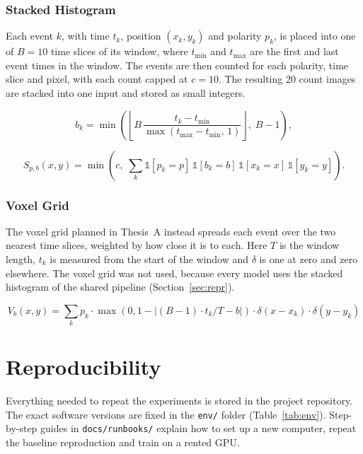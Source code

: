\documentclass[11pt, a4paper]{report}
\begin{document}
\subsection{Stacked Histogram}
\label{subsec:stacked_hist}
Each event $k$, with time $t_k$, position $(x_k, y_k)$ and polarity $p_k$, is placed into one of $B=10$ time
slices of its window, where $t_{\min}$ and $t_{\max}$ are the first and last event times in the window. The
events are then counted for each polarity, time slice and pixel, with each count capped at $c=10$. The
resulting 20 count images are stacked into one input and stored as small integers.

\begin{equation}
  b_k = \min\!\left(\left\lfloor B\,\frac{t_k - t_{\min}}{\max(t_{\max}-t_{\min},\,1)}\right\rfloor,\; B-1\right),
  \label{eq:sh_bin}
\end{equation}

\begin{equation}
  S_{p,b}(x,y) = \min\!\left(c,\; \sum_k \mathbb{1}[p_k=p]\,\mathbb{1}[b_k=b]\,\mathbb{1}[x_k=x]\,\mathbb{1}[y_k=y]\right).
  \label{eq:sh_count}
\end{equation}

\subsection{Voxel Grid}
The voxel grid planned in Thesis~A instead spreads each event over the two nearest time slices, weighted by
how close it is to each. Here $T$ is the window length, $t_k$ is measured from the start of the window and
$\delta$ is one at zero and zero elsewhere. The voxel grid was not used, because every model uses the stacked
histogram of the shared pipeline (Section~\ref{sec:repr}).

\begin{equation}
    V_b(x, y) = \sum_k p_k \cdot \max(0, 1 - |(B-1) \cdot t_k / T - b|) \cdot \delta(x-x_k) \cdot \delta(y-y_k)
\end{equation}

\chapter{Reproducibility}
\label{app:repro}
Everything needed to repeat the experiments is stored in the project repository. The exact software versions
are fixed in the \texttt{env/} folder (Table~\ref{tab:env}). Step-by-step guides in \texttt{docs/runbooks/}
explain how to set up a new computer, repeat the baseline reproduction and train on a rented GPU.
\end{document}
